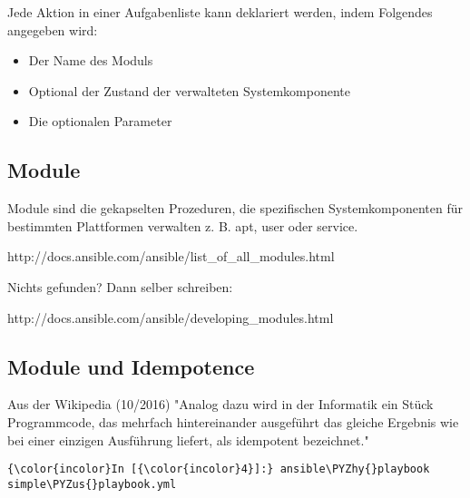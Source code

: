 \documentclass[11pt]{article}
\providecommand{\tightlist}{%
      \setlength{\itemsep}{0pt}\setlength{\parskip}{0pt}}
\def\PYZus{\char`\_}
\def\PYZhy{\char`\-}
\begin{document}
Jede Aktion in einer Aufgabenliste kann deklariert werden, indem
Folgendes angegeben wird:

\begin{itemize}
\tightlist
\item
  Der Name des Moduls
\item
  Optional der Zustand der verwalteten Systemkomponente
\item
  Die optionalen Parameter
\end{itemize}

\subsection{Module}\label{module}

Module sind die gekapselten Prozeduren, die spezifischen
Systemkomponenten für bestimmten Plattformen verwalten z. B. apt, user
oder service.

http://docs.ansible.com/ansible/list\_of\_all\_modules.html

Nichts gefunden? Dann selber schreiben:

http://docs.ansible.com/ansible/developing\_modules.html

\subsection{Module und Idempotence}\label{module-und-idempotence}

Aus der Wikipedia (10/2016) "Analog dazu wird in der Informatik ein
Stück Programmcode, das mehrfach hintereinander ausgeführt das gleiche
Ergebnis wie bei einer einzigen Ausführung liefert, als idempotent
bezeichnet."

    \begin{Verbatim}[commandchars=\\\{\}]
{\color{incolor}In [{\color{incolor}4}]:} ansible\PYZhy{}playbook simple\PYZus{}playbook.yml
\end{Verbatim}
\end{document}
